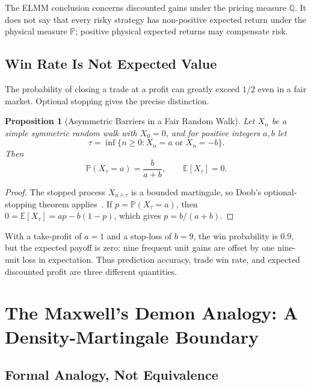 \documentclass[aps,pra,reprint,superscriptaddress,amsmath,amssymb,floatfix]{revtex4-2}
\theoremstyle{plain}
\newtheorem{proposition}[theorem]{Proposition}
\theoremstyle{definition}
\theoremstyle{remark}
\begin{document}
The ELMM conclusion concerns discounted gains under the pricing measure
\(\mathbb{Q}\). It does not say that every risky strategy has non-positive
expected return under the physical measure \(\mathbb{P}\); positive physical
expected returns may compensate risk.

\subsection{Win Rate Is Not Expected Value}

The probability of closing a trade at a profit can greatly exceed \(1/2\)
even in a fair market. Optional stopping gives the precise distinction.

\begin{proposition}[Asymmetric Barriers in a Fair Random Walk]
  \label{prop:optional}
  Let \(X_n\) be a simple symmetric random walk with \(X_0=0\), and for positive
  integers \(a,b\) let
  \[
    \tau=\inf\{n\geq0:X_n=a\text{ or }X_n=-b\}.
  \]
  Then
  \begin{equation}
    \mathbb{P}(X_\tau=a)=\frac{b}{a+b},
    \qquad
    \mathbb{E}[X_\tau]=0.
    \label{eq:gambler}
  \end{equation}
\end{proposition}

\begin{proof}
The stopped process \(X_{n\wedge\tau}\) is a bounded martingale, so Doob's
optional-stopping theorem applies~\cite{Doob1953}. If
\(p=\mathbb{P}(X_\tau=a)\), then
\(0=\mathbb{E}[X_\tau]=ap-b(1-p)\), which gives
\(p=b/(a+b)\).
\end{proof}

With a take-profit of \(a=1\) and a stop-loss of \(b=9\), the win probability
is \(0.9\), but the expected payoff is zero: nine frequent unit gains are
offset by one nine-unit loss in expectation. Thus prediction accuracy, trade
win rate, and expected discounted profit are three different quantities.

\section{The Maxwell's Demon Analogy: A Density-Martingale Boundary}
\label{sec:demon}

\subsection{Formal Analogy, Not Equivalence}
\end{document}
